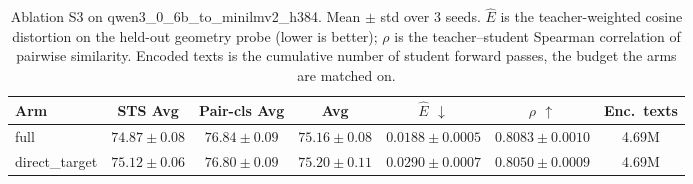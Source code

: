\begin{table}[t]
\centering
\caption{Ablation S3 on qwen3\_0\_6b\_to\_minilmv2\_h384. Mean $\pm$ std over 3 seeds. $\hat{E}$ is the teacher-weighted cosine distortion on the held-out geometry probe (lower is better); $\rho$ is the teacher--student Spearman correlation of pairwise similarity. Encoded texts is the cumulative number of student forward passes, the budget the arms are matched on.}
\label{tab:ablation_s3_qwen3_0_6b_to_minilmv2_h384}
\begin{tabular}{lcccccc}
\toprule
Arm & STS Avg & Pair-cls Avg & Avg & $\hat{E}$ $\downarrow$ & $\rho$ $\uparrow$ & Enc.\ texts \\
\midrule
full & $74.87 \pm 0.08$ & $76.84 \pm 0.09$ & $75.16 \pm 0.08$ & $0.0188 \pm 0.0005$ & $0.8083 \pm 0.0010$ & 4.69M \\
direct\_target & $75.12 \pm 0.06$ & $76.80 \pm 0.09$ & $75.20 \pm 0.11$ & $0.0290 \pm 0.0007$ & $0.8050 \pm 0.0009$ & 4.69M \\
\bottomrule
\end{tabular}
\end{table}
